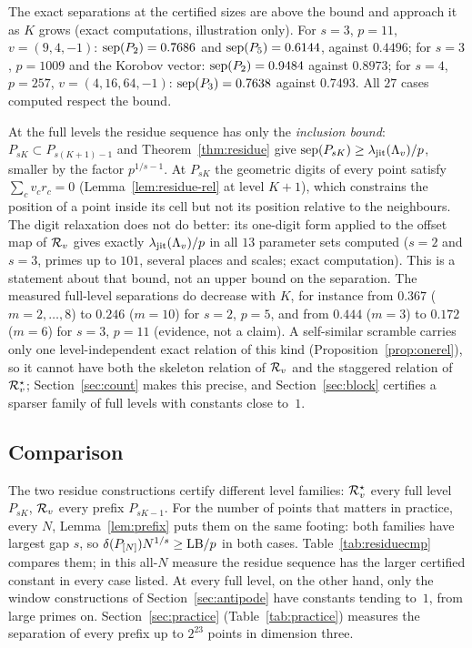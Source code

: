 \begin{remark}\label{rem:residueexact}
The exact separations at the certified sizes are above the bound and approach it as $K$ grows (exact computations, illustration only). For $s=3$, $p=11$, $v=(9,4,-1)$: $\operatorname{sep}(P_2)=0.7686$ and $\operatorname{sep}(P_5)=0.6144$, against $0.4496$; for $s=3$, $p=1009$ and the Korobov vector: $\operatorname{sep}(P_2)=0.9484$ against $0.8973$; for $s=4$, $p=257$, $v=(4,16,64,-1)$: $\operatorname{sep}(P_3)=0.7638$ against $0.7493$. All $27$ cases computed respect the bound.
\end{remark}

\begin{remark}\label{rem:residuefull}
At the full levels the residue sequence has only the \emph{inclusion bound}: $P_{sK}\subset P_{s(K+1)-1}$ and Theorem~\ref{thm:residue} give $\operatorname{sep}(P_{sK})\ge\lambda_{\mathrm{jit}}(\Lambda_v)/p$, smaller by the factor $p^{1/s-1}$. At $P_{sK}$ the geometric digits of every point satisfy $\sum_cv_cr_c=0$ (Lemma~\ref{lem:residue-rel} at level $K+1$), which constrains the position of a point inside its cell but not its position relative to the neighbours. The digit relaxation does not do better: its one-digit form applied to the offset map of $\mathcal{R}_v$ gives exactly $\lambda_{\mathrm{jit}}(\Lambda_v)/p$ in all $13$ parameter sets computed ($s=2$ and $s=3$, primes up to $101$, several places and scales; exact computation). This is a statement about that bound, not an upper bound on the separation. The measured full-level separations do decrease with $K$, for instance from $0.367$ ($m=2,\dots,8$) to $0.246$ ($m=10$) for $s=2$, $p=5$, and from $0.444$ ($m=3$) to $0.172$ ($m=6$) for $s=3$, $p=11$ (evidence, not a claim). A self-similar scramble carries only one level-independent exact relation of this kind (Proposition~\ref{prop:onerel}), so it cannot have both the skeleton relation of $\mathcal{R}_v$ and the staggered relation of $\mathcal{R}^{\star}_v$; Section~\ref{sec:count} makes this precise, and Section~\ref{sec:block} certifies a sparser family of full levels with constants close to~$1$.
\end{remark}

\subsection{Comparison}\label{sec:residuecmp}
The two residue constructions certify different level families: $\mathcal{R}^{\star}_v$ every full level $P_{sK}$, $\mathcal{R}_v$ every prefix $P_{sK-1}$. For the number of points that matters in practice, every $N$, Lemma~\ref{lem:prefix} puts them on the same footing: both families have largest gap $s$, so $\delta(P_{[N]})N^{1/s}\ge\mathrm{LB}/p$ in both cases. Table~\ref{tab:residuecmp} compares them; in this all-$N$ measure the residue sequence has the larger certified constant in every case listed. At every full level, on the other hand, only the window constructions of Section~\ref{sec:antipode} have constants tending to~$1$, from large primes on. Section~\ref{sec:practice} (Table~\ref{tab:practice}) measures the separation of every prefix up to $2^{23}$ points in dimension three.

